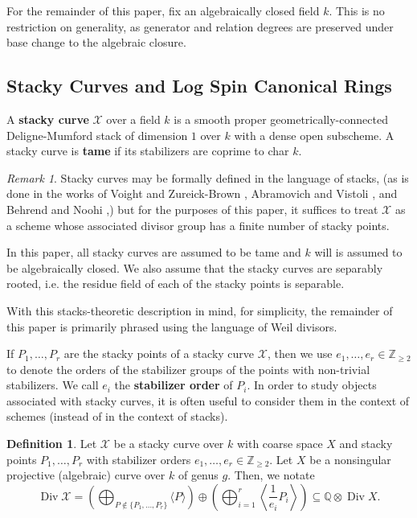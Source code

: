 \documentclass{amsart}
\theoremstyle{plain}
\theoremstyle{definition}
\newtheorem{defn}[thm]{Definition}
\theoremstyle{remark}
\newtheorem{rem}[thm]{Remark}
\numberwithin{equation}{section}
\newcommand\ssec{\subsection}
\newcommand\BQ{{\mathbb Q}}
\newcommand\BZ{{\mathbb Z}}
\DeclareMathOperator\di{Div}
\newcommand\sx{\mathscr X}
\begin{document}
For the remainder of this paper, fix an algebraically closed field $k$.
This is no restriction on generality, as generator and relation degrees are preserved under base change to the algebraic closure.

\ssec{Stacky Curves and Log Spin Canonical Rings}
\label{ssec:stacky-background}
A \textbf{stacky curve} $\sx$ over a field $k$ is a smooth proper
geometrically-connected Deligne-Mumford stack of dimension $1$ over
$k$ with a dense open subscheme. A stacky curve is \textbf{tame} if
its stabilizers are coprime to char $k$.

\begin{rem}
\label{rem:stack-formalism}
Stacky curves may be formally defined in the language of stacks, (as
is done in the works of Voight and Zureick-Brown \cite{vzb:stacky},
Abramovich and Vistoli \cite{abramovich-vistoli:compactifying}, and
Behrend and Noohi \cite{behrend-noohi:uniformization},) but for the
purposes of this paper, it suffices to treat $\sx$ as a scheme
whose associated divisor group has a finite number of stacky
points.

In this paper, all stacky curves are assumed to be tame and
$k$ will is assumed to be algebraically closed. We also assume that the
stacky curves are separably rooted, i.e. the residue field of each
of the stacky points is separable.

With this stacks-theoretic description in mind, for simplicity, the remainder of this paper is primarily phrased using the language
of Weil divisors.
\end{rem}

If $P_1, \ldots, P_r$ are the stacky points of a stacky curve $\sx$,
then we use $e_1, \ldots, e_r \in \BZ_{\geq 2}$ to denote the orders
of the stabilizer groups of the points with non-trivial
stabilizers. We call $e_i$ the \textbf{stabilizer order} of $P_i$.
In order to study objects associated with stacky curves, it is often
useful to consider them in the context of schemes (instead of in the context of stacks). 

\begin{defn}
\label{defn:coarse-space}
Let $\sx$ be a stacky curve over $k$ with coarse space $X$ and stacky points $P_1, \ldots,
P_r$ with stabilizer orders $e_1, \ldots, e_r \in \BZ_{\geq 2}$.
Let $X$ be a nonsingular projective (algebraic) curve over $k$ of
genus $g$. Then, we notate
\[
	\di \sx = \left(\bigoplus_{P\notin \{P_1, \ldots, P_r\}} \langle 
	P \rangle \right) \oplus \left(\bigoplus_{i = 1}^r \left \langle 
	\frac{1}{e_i}P_i \right \rangle \right) \subseteq \BQ \otimes \di X.
\]
\end{defn}
\end{document}
